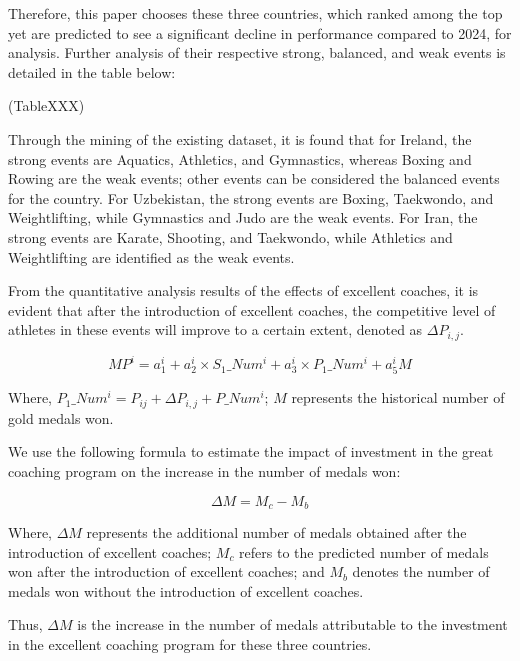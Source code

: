 \documentclass{mcmthesis}
\begin{document}
Therefore, this paper chooses these three countries, which ranked among the top yet are predicted to see a significant decline in performance compared to 2024, for analysis. Further analysis of their respective strong, balanced, and weak events is detailed in the table below:

(TableXXX)

Through the mining of the existing dataset, it is found that for Ireland, the strong events are Aquatics, Athletics, and Gymnastics, whereas Boxing and Rowing are the weak events; other events can be considered the balanced events for the country. For Uzbekistan, the strong events are Boxing, Taekwondo, and Weightlifting, while Gymnastics and Judo are the weak events. For Iran, the strong events are Karate, Shooting, and Taekwondo, while Athletics and Weightlifting are identified as the weak events.

From the quantitative analysis results of the effects of excellent coaches, it is evident that after the introduction of excellent coaches, the competitive level of athletes in these events will improve to a certain extent, denoted as $\Delta P_{i, j}$.

\begin{equation}
MP^{i} = a_{1} ^ {i} + a_{2} ^{i}\times S_{1}\_Num^{i} + a_{3}^{i}\times P_{1}\_Num^{i} + a_{5}^{i}M
\end{equation}

Where, $P_{1}\_Num^{i}=P_{ij} + \Delta P_{i, j} + P\_Num^{i}$; $M$ represents the historical number of gold medals won.

We use the following formula to estimate the impact of investment in the great coaching program on the increase in the number of medals won:

\begin{equation}
\Delta M=M_{c} - M_{b}
\end{equation}

Where, $\Delta M$ represents the additional number of medals obtained after the introduction of excellent coaches; $M_{c}$ refers to the predicted number of medals won after the introduction of excellent coaches; and $M_{b}$ denotes the number of medals won without the introduction of excellent coaches.

Thus, $\Delta M$ is the increase in the number of medals attributable to the investment in the excellent coaching program for these three countries.
\end{document}

